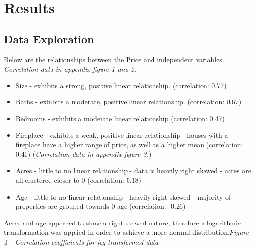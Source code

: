 \documentclass[10pt,A4,makeidx]{article}
\begin{document}
\section{Results}
  \subsection{Data Exploration}

  Below are the relationships between the Price and independent variables.\\
  \emph{Correlation data in appendix figure 1 and 2.}
  \begin{itemize}
    \item Size - exhibits a strong, positive linear relationship. (correlation: 0.77)
    \item Baths - exhibits a moderate, positive linear relationship. (correlation: 0.67)
    \item Bedrooms - exhibits a moderate linear relationship (correlation: 0.47)
    \item Fireplace - exhibits a weak, positive linear relationship - houses 
    with a fireplace have a higher range of price, as well as a higher mean (correlation: 0.41)
    (\emph{Correlation data in appendix figure 3.})
    \item Acres - little to no linear relationship - data is heavily right skewed 
      \subitem - acres are all clustered closer to 0 (correlation: 0.18)
    \item Age - little to no linear relationship - heavily right skewed
      \subitem - majority of properties are grouped
    towards 0 age (correlation: -0.26)\\
  \end{itemize}
  
  Acres and age appeared to show a right skewed nature, therefore a logarithmic transformation was applied
  in order to achieve a more normal distribution.\emph{Figure 4 - Correlation coefficients for log transformed data}\\
  
\end{document}
